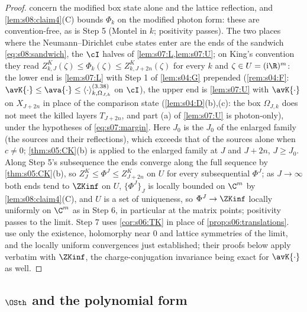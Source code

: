 \begin{proof}
 concern the modified box state alone and the lattice reflection, and \cref{lem:s08:claim4}(C) bounds $\Phi_k$ on the modified photon form: these are convention-free, as is Step 5 (Montel in $k$; positivity passes). The two places where the Neumann--Dirichlet cube states enter are the ends of the sandwich \eqref{eq:s08:sandwich}, \ie the $\cI$ halves of \cref{lem:s07:L,lem:s07:U}; on King's convention they read $Z^K_{k,J}(\zeta)\le\Phi_k(\zeta)\le Z^K_{k,J+2n}(\zeta)$ for every $k$ and $\zeta\in U=(\mathrm i\R)^m$: the lower end is \cref{lem:s07:L} with Step 1 of \cref{lem:s04:G} prepended (\cref{rem:s04:F}: $\avK{\cdot}\le\ava{\cdot}\le\langle\cdot\rangle^{(3.38)}_{k,\Omega_{J,k}}$ on $\cI$), the upper end is \cref{lem:s07:U} with $\avK{\cdot}$ on $X_{J+2n}$ in place of the comparison state (\cref{lem:s04:D}(b),(c): the box $\Omega_{J,k}$ does not meet the killed layers $T_{J+2n}$, and part (a) of \cref{lem:s07:U} is photon-only), under the hypotheses of \eqref{eq:s07:margin}. Here $J_0$ is the $J_0$ of the enlarged family (the sources and their reflections), which exceeds that of the sources alone when $c\ne0$; \cref{thm:s05:CK}(b) is applied to the enlarged family at $J$ and $J+2n$, $J\ge J_0$. Along Step 5's subsequence the ends converge along the full sequence by \cref{thm:s05:CK}(b), so $Z^K_J\le\Phi^J\le Z^K_{J+2n}$ on $U$ for every subsequential $\Phi^J$; as $J\to\infty$ both ends tend to $\ZKinf$ on $U$, $\{\Phi^J\}_J$ is locally bounded on $\C^m$ by \cref{lem:s08:claim4}(C), and $U$ is a set of uniqueness, so $\Phi^J\to\ZKinf$ locally uniformly on $\C^m$ as in Step 6, in particular at the matrix points; positivity passes to the limit. Step 7 uses \cref{cor:s06:TK} in place of \cref{prop:s06:translations}.  use only the existence, holomorphy near $0$ and lattice symmetries of the limit, and the locally uniform convergences just established; their proofs below apply verbatim with $\ZKinf$, the charge-conjugation invariance being exact for $\avK{\cdot}$ as well.
\end{proof}

\subsection{\texorpdfstring{$\OSth$}{OS3} and the polynomial form}

